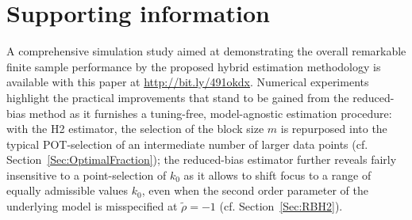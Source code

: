 \documentclass[11pt, a4paper, oneside]{article}
\numberwithin{equation}{section}
\theoremstyle{plain}
\theoremstyle{definition}
\begin{document}
\section*{Supporting information}
A comprehensive simulation study aimed at demonstrating the overall remarkable finite sample performance by the proposed hybrid estimation methodology is available with this paper at \url{http://bit.ly/491okdx}. Numerical experiments highlight the practical improvements that stand to be gained from the reduced-bias method as it furnishes a tuning-free, model-agnostic estimation procedure: with the H2 estimator, the selection of the block size $m$ is repurposed into the typical POT-selection of an intermediate number of larger data points (cf. Section~\ref{Sec:OptimalFraction}); the reduced-bias estimator further reveals fairly insensitive to a point-selection of $k_0$ as it allows to shift focus to a range of equally admissible values $k_0$, even when the second order parameter of the underlying model is misspecified at $\tilde{\rho}=-1$ (cf. Section~\ref{Sec:RBH2}). %



\end{document}
